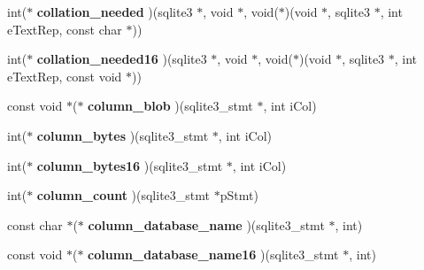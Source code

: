 \begin{DoxyCompactItemize}
\mbox{\label{structsqlite3__api__routines_aa26fb10907a304b5afd943061dd08ab7}} 
int($\ast$ {\bfseries collation\+\_\+needed} )(sqlite3 $\ast$, void $\ast$, void($\ast$)(void $\ast$, sqlite3 $\ast$, int e\+Text\+Rep, const char $\ast$))
\item 
\mbox{\label{structsqlite3__api__routines_a35eb5a4b4df8b310e5e9ffbaa735d38f}} 
int($\ast$ {\bfseries collation\+\_\+needed16} )(sqlite3 $\ast$, void $\ast$, void($\ast$)(void $\ast$, sqlite3 $\ast$, int e\+Text\+Rep, const void $\ast$))
\item 
\mbox{\label{structsqlite3__api__routines_a66f2cefdf5bef54891cbef548f91c781}} 
const void $\ast$($\ast$ {\bfseries column\+\_\+blob} )(sqlite3\+\_\+stmt $\ast$, int i\+Col)
\item 
\mbox{\label{structsqlite3__api__routines_a79150244afb5f778840bc9df72d55342}} 
int($\ast$ {\bfseries column\+\_\+bytes} )(sqlite3\+\_\+stmt $\ast$, int i\+Col)
\item 
\mbox{\label{structsqlite3__api__routines_ac1daf0a08de4a33c8db27a29f13a26ad}} 
int($\ast$ {\bfseries column\+\_\+bytes16} )(sqlite3\+\_\+stmt $\ast$, int i\+Col)
\item 
\mbox{\label{structsqlite3__api__routines_af750a4727dc59edb4ad2933e28bfa358}} 
int($\ast$ {\bfseries column\+\_\+count} )(sqlite3\+\_\+stmt $\ast$p\+Stmt)
\item 
\mbox{\label{structsqlite3__api__routines_a7b8e1de81b22244eab04e90ebed49bf5}} 
const char $\ast$($\ast$ {\bfseries column\+\_\+database\+\_\+name} )(sqlite3\+\_\+stmt $\ast$, int)
\item 
\mbox{\label{structsqlite3__api__routines_af8e642aae1dd0f81828eaa7759791fe9}} 
const void $\ast$($\ast$ {\bfseries column\+\_\+database\+\_\+name16} )(sqlite3\+\_\+stmt $\ast$, int)
\item 
\mbox{\label{structsqlite3__api__routines_aad9e3c9907f96de1d4db36839e98ec01}} 

\end{DoxyCompactItemize}
